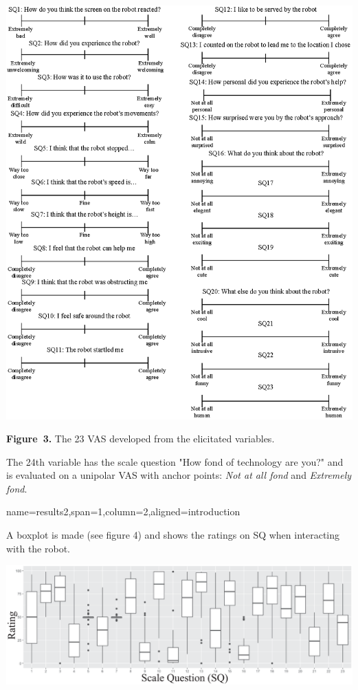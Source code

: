 \documentclass[paperwidth=118cm,paperheight=84cm,landscape,fontscale=0.2941]{baposter}
\begin{document}
\begin{poster}
{\vspace{-15pt}
\begin{center}
	\includegraphics[width=1.0\linewidth]{AllScalesSpaceBig.eps}

\textbf{Figure~3. }The 23 VAS developed from the elicitated variables.
\end{center}
\vspace{-15pt}

The 24th variable has the scale question "How fond of technology are you?" and is evaluated on a unipolar VAS with anchor points: \textit{Not at all fond} and \textit{Extremely fond}.
}



{name=results2,span=1,column=2,aligned=introduction}
{\parskip 5pt
A boxplot is made (see figure 4) and shows the ratings on SQ when interacting with the robot. 
\begin{center}

\vspace{-10pt}
	\includegraphics[width=0.9\linewidth]{Boksplot0er.eps}


\end{center}}
\end{poster}
\end{document}
